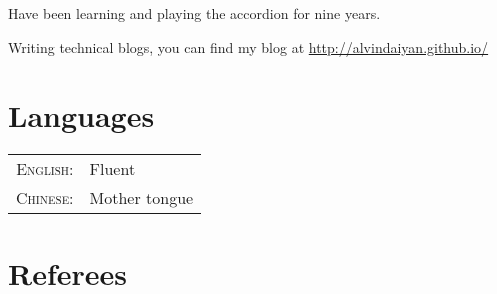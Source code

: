 \documentclass[a4paper,10pt]{article} %
\begin{document}
Have been learning and playing the accordion for nine years.

Writing technical blogs, you can find my blog at \href{http://alvindaiyan.github.io/}{http://alvindaiyan.github.io/}


\section{Languages}

\begin{tabular}{rl}
\textsc{English:} & Fluent\\

\textsc{Chinese:} & Mother tongue\\
\end{tabular}


\section{Referees}
\end{document}
